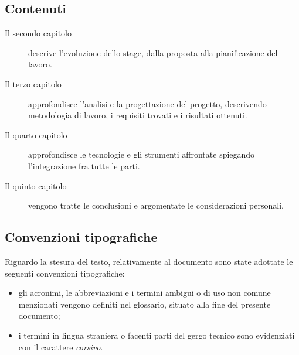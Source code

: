 \subsection{Contenuti}
\begin{description}
	\item[{\hyperref[ch:evoluzione-dello-stage]{Il secondo capitolo}}] descrive l'evoluzione dello stage, dalla proposta alla pianificazione del lavoro.
	
	\item[{\hyperref[ch:analisi-e-progettazione]{Il terzo capitolo}}] approfondisce l'analisi e la progettazione del progetto, descrivendo metodologia di lavoro, i requisiti trovati e i risultati ottenuti.
	
	\item[{\hyperref[ch:sviluppo]{Il quarto capitolo}}] approfondisce le tecnologie e gli strumenti affrontate spiegando l'integrazione fra tutte le parti.
	
	\item[{\hyperref[ch:conlusione]{Il quinto capitolo}}] vengono tratte le conclusioni e argomentate le considerazioni personali.
\end{description}
\subsection{Convenzioni tipografiche}
Riguardo la stesura del testo, relativamente al documento sono state adottate le seguenti convenzioni tipografiche:
\begin{itemize}
	\item gli acronimi, le abbreviazioni e i termini ambigui o di uso non comune menzionati vengono definiti nel glossario, situato alla fine del presente documento;
	\item i termini in lingua straniera o facenti parti del gergo tecnico sono evidenziati con il carattere \emph{corsivo}.
\end{itemize}
